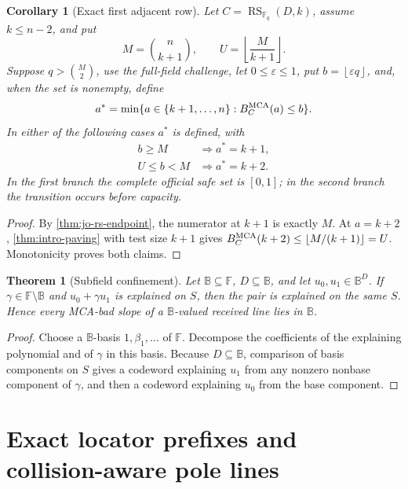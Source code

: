 \documentclass[11pt,a4paper]{amsart}
\numberwithin{equation}{section}
\newtheorem{theorem}{Theorem}[section]
\newtheorem{corollary}[corollary]{Corollary}
\theoremstyle{remark}
\DeclareMathOperator{\RS}{RS}
\newcommand{\F}{\mathbb F}
\newcommand{\B}{\mathbb B}
\newcommand{\eps}{\varepsilon}
\newcommand{\floor}[1]{\left\lfloor #1\right\rfloor}
\begin{document}
\begin{corollary}[Exact first adjacent row]
\label{thm:exact-first-adjacent-row}
Let \(C=\RS_{\F_q}(D,k)\), assume \(k\le n-2\), and put
\[
 M=\binom n{k+1},\qquad U=\floor{\frac{M}{k+1}}.
\]
Suppose \(q>\binom M2\), use the full-field challenge, let
\(0\le\eps\le1\), put \(b=\floor{\eps q}\), and, when the set is nonempty,
define
\[
 a^*=\min\{a\in\{k+1,\ldots,n\}:B_C^{\rm MCA}(a)\le b\}.
\]
In either of the following cases \(a^*\) is defined, with
\[
 \begin{array}{ll}
 b\ge M &\Longrightarrow a^*=k+1,\\[1mm]
 U\le b<M&\Longrightarrow a^*=k+2.
 \end{array}                                      \tag{AD}
\]
In the first branch the complete official safe set is \([0,1]\); in the
second branch the transition occurs before capacity.
\end{corollary}

\begin{proof}
By \cref{thm:jo-rs-endpoint}, the numerator at \(k+1\) is exactly \(M\).
At \(a=k+2\), \cref{thm:intro-paving} with test size \(k+1\) gives
\(B_C^{\rm MCA}(k+2)\le\floor{M/(k+1)}=U\).  Monotonicity proves both
claims.
\end{proof}

\begin{theorem}[Subfield confinement]\label{thm:subfield-confinement-full}
Let \(\B\subseteq\F\), \(D\subseteq\B\), and let \(u_0,u_1\in\B^D\).  If
\(\gamma\in\F\setminus\B\) and \(u_0+\gamma u_1\) is explained on \(S\),
then the pair is explained on the same \(S\).  Hence every MCA-bad slope of
a \(\B\)-valued received line lies in \(\B\).
\end{theorem}

\begin{proof}
Choose a \(\B\)-basis \(1,\beta_1,\ldots\) of \(\F\).  Decompose the
coefficients of the explaining polynomial and of \(\gamma\) in this basis.
Because \(D\subseteq\B\), comparison of basis components on \(S\) gives a
codeword explaining \(u_1\) from any nonzero nonbase component of
\(\gamma\), and then a codeword explaining \(u_0\) from the base component.
\end{proof}

\section{Exact locator prefixes and collision-aware pole lines}
\label{sec:exact-prefix-pole}
\end{document}

